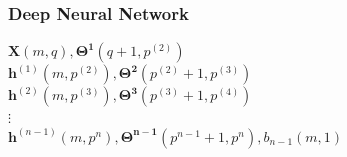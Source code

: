 \documentclass{beamer}
\begin{document}
  
  
    \begin{frame}
    \frametitle{Deep Neural Network}
    $\textbf{X}(m,q), \mathbf{\Theta^{1}}(q+1,p^{(2)})$ \\
    $\textbf{h}^{(1)}(m,p^{(2)}), \mathbf{\Theta^{2}}(p^{(2)}+1,p^{(3)})$\\
    $\textbf{h}^{(2)}(m,p^{(3)}), \mathbf{\Theta^{3}}(p^{(3)}+1,p^{(4)})$\\ 
    $\vdots$\\
    $\textbf{h}^{(n-1)}(m,p^{n}), \mathbf{\Theta^{n-1}}(p^{n-1}+1,p^{n}), b_{n-1}(m,1)$\\ \vspace{0.5cm}	
\end{frame} 
\end{document}
